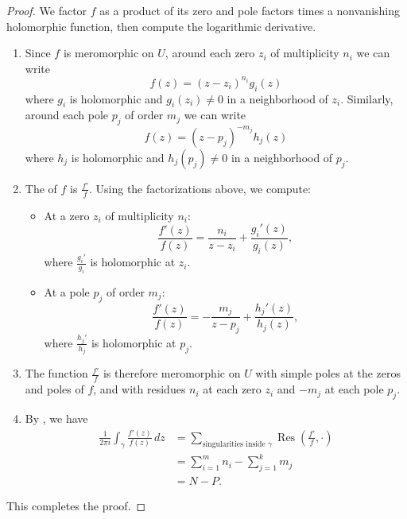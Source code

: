 \begin{proof}
    We factor $f$ as a product of its zero and pole factors times a nonvanishing holomorphic function, then compute the logarithmic derivative.

    \begin{enumerate}
        \item Since $f$ is meromorphic on $U$, around each zero $z_i$ of multiplicity $n_i$ we can write
        $$f(z) = (z - z_i)^{n_i} g_i(z)$$
        where $g_i$ is holomorphic and $g_i(z_i) \neq 0$ in a neighborhood of $z_i$. Similarly, around each pole $p_j$ of order $m_j$ we can write
        $$f(z) = (z - p_j)^{-m_j} h_j(z)$$
        where $h_j$ is holomorphic and $h_j(p_j) \neq 0$ in a neighborhood of $p_j$.

        \item The  of $f$ is $\frac{f'}{f}$. Using the factorizations above, we compute:
        \begin{itemize}
            \item At a zero $z_i$ of multiplicity $n_i$:
            $$\frac{f'(z)}{f(z)} = \frac{n_i}{z - z_i} + \frac{g_i'(z)}{g_i(z)},$$
            where $\frac{g_i'}{g_i}$ is holomorphic at $z_i$.
            \item At a pole $p_j$ of order $m_j$:
            $$\frac{f'(z)}{f(z)} = -\frac{m_j}{z - p_j} + \frac{h_j'(z)}{h_j(z)},$$
            where $\frac{h_j'}{h_j}$ is holomorphic at $p_j$.
        \end{itemize}

        \item The function $\frac{f'}{f}$ is therefore meromorphic on $U$ with simple poles at the zeros and poles of $f$, and with residues $n_i$ at each zero $z_i$ and $-m_j$ at each pole $p_j$.

        \item By , we have
        \begin{align*}
        \frac{1}{2\pi i} \int_{\gamma} \frac{f'(z)}{f(z)} \, dz &= \sum_{\text{singularities inside } \gamma} \operatorname{Res}\left(\frac{f'}{f}, \cdot\right) \\
        &= \sum_{i=1}^{m} n_i - \sum_{j=1}^{k} m_j \\
        &= N - P.
        \end{align*}
    \end{enumerate}

    This completes the proof.
\end{proof}